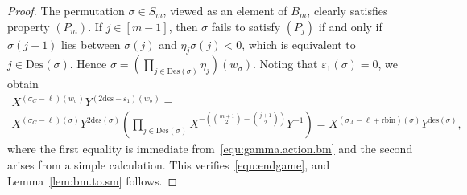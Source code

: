 \documentclass[11pt,a4paper]{amsart}
\theoremstyle{plain}
\theoremstyle{remark}
\begin{document}
\begin{proof}
The permutation $\sigma \in S_m$, viewed as an element of $B_m$, clearly satisfies property $(P_m)$.  If $j \in [m-1]$, then $\sigma$ fails to satisfy $(P_j)$ if and only if $\sigma(j+1)$ lies between $\sigma(j)$ and $\eta_j \sigma(j) < 0$, which is equivalent to $j \in \mathrm{Des}(\sigma)$.  Hence $\sigma = \left( \prod_{j \in \mathrm{Des}(\sigma)} \eta_j \right) (w_\sigma)$.  Noting that $\varepsilon_1(\sigma) = 0$, we obtain
\begin{multline*}
X^{(\sigma_C - \ell)(w_\sigma)} Y^{(2 \mathrm{des} - \varepsilon_1)(w_\sigma)} = \\
X^{(\sigma_C - \ell)(\sigma)} Y^{2 \mathrm{des} (\sigma)} \left( \prod_{j \in \mathrm{Des}(\sigma)} X^{ - \left( \binom{m+1}{2} - \binom{j+1}{2} \right)}Y^{-1} \right) = 
X^{(\sigma_A - \ell + \mathrm{rbin})(\sigma)} Y^{\mathrm{des}(\sigma)},
\end{multline*}
where the first equality is immediate from~\eqref{equ:gamma.action.bm} and the second arises from a simple calculation.  This verifies~\eqref{equ:endgame}, and Lemma~\ref{lem:bm.to.sm} follows.


\end{proof}
\end{document}
